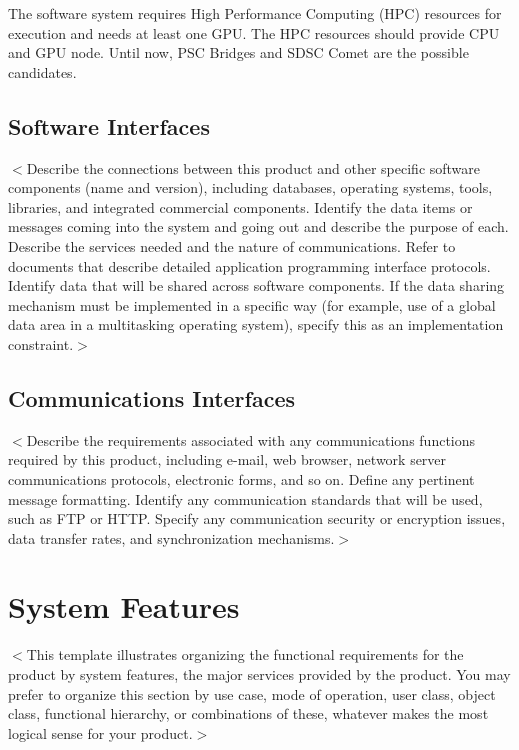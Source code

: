 \documentclass{scrreprt}
\begin{document}
The software system requires High Performance Computing (HPC) resources for execution 
and needs at least one GPU. The HPC resources should provide CPU and GPU node. 
Until now, PSC Bridges and SDSC Comet are the possible candidates.

\section{Software Interfaces}
$<$Describe the connections between this product and other specific software 
components (name and version), including databases, operating systems, tools, 
libraries, and integrated commercial components. Identify the data items or 
messages coming into the system and going out and describe the purpose of each.  
Describe the services needed and the nature of communications. Refer to 
documents that describe detailed application programming interface protocols.  
Identify data that will be shared across software components. If the data 
sharing mechanism must be implemented in a specific way (for example, use of a 
global data area in a multitasking operating system), specify this as an 
implementation constraint.$>$

\section{Communications Interfaces}
$<$Describe the requirements associated with any communications functions 
required by this product, including e-mail, web browser, network server 
communications protocols, electronic forms, and so on. Define any pertinent 
message formatting. Identify any communication standards that will be used, such 
as FTP or HTTP. Specify any communication security or encryption issues, data 
transfer rates, and synchronization mechanisms.$>$


\chapter{System Features}
$<$This template illustrates organizing the functional requirements for the 
product by system features, the major services provided by the product. You may 
prefer to organize this section by use case, mode of operation, user class, 
object class, functional hierarchy, or combinations of these, whatever makes the 
most logical sense for your product.$>$
\end{document}
